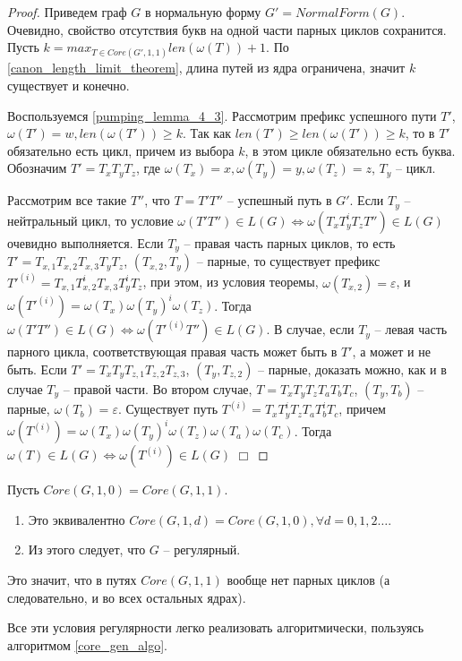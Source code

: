 \begin{proof}
    Приведем граф $G$ в нормальную форму $G' = NormalForm(G)$. 
    Очевидно, свойство отсутствия букв на одной части парных циклов сохранится.
    Пусть $k = max_{T \in Core(G',1,1)} len(\omega(T)) + 1$. 
    По \ref{canon_length_limit_theorem}, длина путей из ядра ограничена, значит $k$ существует и конечно.

    Воспользуемся \ref{pumping_lemma_4_3}.
    Рассмотрим префикс успешного пути $T'$, $\omega(T') = w, len(\omega(T')) \geq k$. 
    Так как $len(T') \geq len(\omega(T')) \geq k$, то в $T'$ обязательно есть цикл, 
    причем из выбора $k$, в этом цикле обязательно есть буква.
    Обозначим $T' = T_x T_y T_z$, где $\omega(T_x) = x, \omega(T_y) = y, \omega(T_z) = z$, $T_y$ -- цикл.
    
    Рассмотрим все такие $T''$, что $T = T' T''$ -- успешный путь в $G'$.
    Если $T_y$ -- нейтральный цикл, то условие $\omega(T' T'') \in L(G) \iff \omega(T_x T_y^i T_z T'') \in L(G)$ очевидно выполняется.
    Если $T_y$ -- правая часть парных циклов, то есть $T' = T_{x,1} T_{x,2} T_{x,3} T_y T_z$, $(T_{x,2}, T_y)$ -- парные,
    то существует префикс $T'^{(i)} = T_{x,1} T_{x,2}^i T_{x,3} T_y^i T_z$, при этом, из условия теоремы, $\omega(T_{x,2}) = \varepsilon$,
    и $\omega(T'^{(i)}) = \omega(T_x) \omega(T_y)^i \omega(T_z)$. Тогда $\omega(T' T'') \in L(G) \iff \omega(T'^{(i)} T'') \in L(G)$.
    В случае, если $T_y$ -- левая часть парного цикла, соответствующая правая часть может быть в $T'$, а может и не быть. 
    Если $T' = T_x T_y T_{z,1} T_{z,2} T_{z,3}$, $(T_y,T_{z,2})$ -- парные, доказать можно, как и в случае $T_y$ -- правой части.
    Во втором случае, $T = T_x T_y T_z T_a T_b T_c$, $(T_y,T_b)$ -- парные,
    $\omega(T_b) = \varepsilon$. Существует путь $T^{(i)} = T_x T_y^i T_z T_a T_b^i T_c$, 
    причем $\omega(T^{(i)}) = \omega(T_x) \omega(T_y)^i \omega(T_z) \omega(T_a) \omega(T_c)$. Тогда $\omega(T) \in L(G) \iff \omega(T^{(i)}) \in L(G)$ $\Box$

\end{proof}

\begin{corollary}
    \label{codition_only_neutral}
    Пусть $Core(G, 1, 0) = Core(G, 1, 1)$.
    \begin{enumerate}[label=\arabic*)]
        \item Это эквивалентно $Core(G, 1, d) = Core(G, 1, 0), \forall d = 0,1,2 \dots$.
        \item Из этого следует, что $G$ -- регулярный.
    \end{enumerate}
\end{corollary}
Это значит, что в путях $Core(G, 1, 1)$ вообще нет парных циклов (а следовательно, и во всех остальных ядрах).


Все эти условия регулярности легко реализовать алгоритмически, пользуясь алгоритмом \ref{core_gen_algo}.

\clearpage